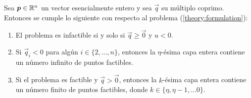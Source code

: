 \begin{theorem}
	\label{theory:th:feasibility}
	Sea $\boldsymbol{p} \in \mathbb{R}^n$ un vector esencialmente entero y sea $\vec{q}$ su múltiplo coprimo.
	Entonces se cumple lo siguiente con respecto al problema (\ref{theory:formulation}):
	\begin{enumerate}
		\item El problema es infactible si y solo si $\vec{q} \geq \vec{0}$ y $u < 0$.
		\item Si $\vec{q}_i < 0$ para algún $i \in \lbrace 2, \ldots, n
			\rbrace$, entonces la $\eta$-ésima capa entera contiene un número infinito de puntos
			factibles.
		\item Si el problema es factible y $\vec{q} > \vec{0}$, entonces la $k$-ésima capa entera
			contiene un número finito de puntos factibles, donde $k \in \lbrace \eta, \eta - 1,
			\ldots 0 \rbrace$.
	\end{enumerate}
\end{theorem}
